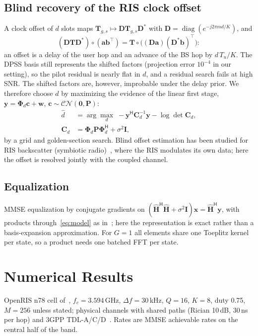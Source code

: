 \documentclass[journal]{IEEEtran}
\DeclareMathOperator{\diag}{diag}
\begin{document}
\subsection{Blind recovery of the RIS clock offset}
A clock offset of $d$ slots maps $\bm T_{g,s}\mapsto\bm D\bm T_{g,s}\bm D^*$ with
$\bm D=\diag(e^{-j2\pi md/K})$, and
\begin{equation}
(\bm D\bm T\bm D^*)\circ(\bm a\bm b^{\top})=\bm T\circ\big((\bm D\bm a)(\bm D^*\bm b)^{\top}\big):
\end{equation}
an offset is a delay of the user hop and an advance of the BS hop by $d\,T_u/K$.
The DPSS basis still represents the shifted factors (projection error $10^{-4}$
in our setting), so the pilot residual is nearly flat in $d$, and a residual
search fails at high SNR. The shifted factors are, however, improbable under
the delay prior. We therefore choose $d$ by maximizing the evidence of the
linear first stage, $\bm y=\bm\Phi_d\bm c+\bm w$, $\bm c\sim\mathcal{CN}(\bm 0,\bm P)$:
\begin{align}
\hat d&=\arg\max_d\; -\bm y^{\mathsf H}\bm C_d^{-1}\bm y-\log\det\bm C_d,\\
\bm C_d&=\bm\Phi_d\bm P\bm\Phi_d^{\mathsf H}+\sigma^2\bm I,
\end{align}
by a grid and golden-section search. Blind offset estimation has been studied for RIS backscatter (symbiotic radio)~\cite{chen2024sr}, where the RIS modulates its own data; here the offset is resolved jointly with the coupled channel.

\subsection{Equalization}
MMSE equalization by conjugate gradients on
$(\hat{\bm H}^{\mathsf H}\hat{\bm H}+\sigma^2\bm I)\bm x=\hat{\bm H}^{\mathsf H}\bm y$,
with products through~\eqref{eq:model} as in~\cite{hrycak2010}; here the
representation is exact rather than a basis-expansion approximation. For $G=1$
all elements share one Toeplitz kernel per state, so a product needs one batched
FFT per state.

\section{Numerical Results}
OpenRIS n78 cell of~\cite[Table~I]{iudice2026}, $f_c=3.594$\,GHz, $\Delta f=30$\,kHz,
$Q=16$, $K=8$, duty 0.75, $M=256$ unless stated; physical channels with shared paths
(Rician 10\,dB, 30\,ns per hop) and 3GPP TDL-A/C/D~\cite{tr38901}. Rates are MMSE
achievable rates on the central half of the band.
\end{document}
